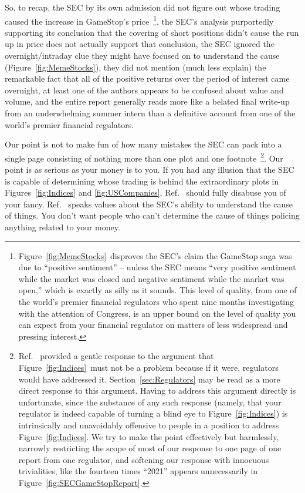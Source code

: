 \documentclass[twocolumn,twoside,prd,floatfix,letterpaper]{revtex4}
\def \FigMain {Figure~\ref{fig:Indices}}
\def \FigSEC {Figure~\ref{fig:SECGameStopReport}}
\def \FigMeme {Figure~\ref{fig:MemeStocks}}
\begin{document}
So, to recap, the SEC by its own admission did not figure out whose trading caused the increase in GameStop's price~\footnote{\FigMeme\ disproves the SEC's claim the GameStop saga was due to ``positive sentiment'' -- unless the SEC means ``very positive sentiment while the market was closed and negative sentiment while the market was open,'' which is exactly as silly as it sounds.  This level of quality, from one of the world's premier financial regulators who spent nine months investigating with the attention of Congress, is an upper bound on the level of quality you can expect from your financial regulator on matters of less widespread and pressing interest.}, the SEC's analysis purportedly supporting its conclusion that the covering of short positions didn't cause the run up in price does not actually support that conclusion, the SEC ignored the overnight/intraday clue they might have focused on to understand the cause (\FigMeme), they did not mention (much less explain) the remarkable fact that all of the positive returns over the period of interest came overnight, at least one of the authors appears to be confused about value and volume, and the entire report generally reads more like a belated final write-up from an underwhelming summer intern than a definitive account from one of the world's premier financial regulators.

Our point is not to make fun of how many mistakes the SEC can pack into a single page consisting of nothing more than one plot and one footnote~\footnote{Ref.~\cite{knuteson2021} provided a gentle response to the argument that \FigMain\ must not be a problem because if it were, regulators would have addressed it.  Section~\ref{sec:Regulators} may be read as a more direct response to this argument.  Having to address this argument directly is unfortunate, since the substance of any such response (namely, that your regulator is indeed capable of turning a blind eye to \FigMain) is intrinsically and unavoidably offensive to people in a position to address \FigMain.  We try to make the point effectively but harmlessly, narrowly restricting the scope of most of our response to one page of one report from one regulator, and softening our response with innocuous trivialities, like the fourteen times ``2021'' appears unnecessarily in \FigSEC.}.  Our point is as serious as your money is to you.  If you had any illusion that the SEC is capable of determining whose trading is behind the extraordinary plots in Figures~\ref{fig:Indices} and \ref{fig:USCompanies}, Ref.~\cite{SECGameStopReport} should fully disabuse you of your fancy.  Ref.~\cite{SECGameStopReport} speaks values about the SEC's ability to understand the cause of things.  You don't want people who can't determine the cause of things policing anything related to your money.
\end{document}
